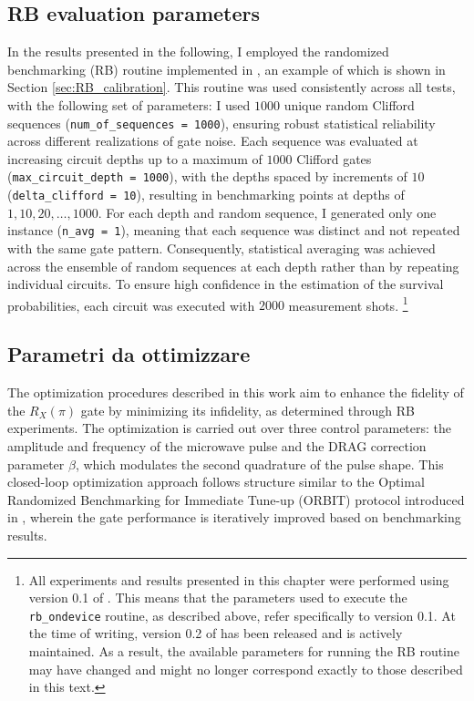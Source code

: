 \subsection{RB evaluation parameters}
In the results presented in the following, I employed the randomized benchmarking (RB) routine implemented in \Qibocal, an example of which is shown in Section \ref{sec:RB_calibration}. 
This routine was used consistently across all tests, with the following set of parameters: I used $1000$ unique random Clifford sequences (\texttt{num\_of\_sequences = 1000}), ensuring robust statistical reliability across different realizations of gate noise. 
Each sequence was evaluated at increasing circuit depths up to a maximum of $1000$ Clifford gates (\texttt{max\_circuit\_depth = 1000}), with the depths spaced by increments of $10$ (\texttt{delta\_clifford = 10}), resulting in benchmarking points at depths of $1, 10, 20, \ldots, 1000$. 
For each depth and random sequence, I generated only one instance (\texttt{n\_avg = 1}), meaning that each sequence was distinct and not repeated with the same gate pattern. 
Consequently, statistical averaging was achieved across the ensemble of random sequences at each depth rather than by repeating individual circuits. 
To ensure high confidence in the estimation of the survival probabilities, each circuit was executed with $2000$ measurement shots. %
\footnote{All experiments and results presented in this chapter were performed using version 0.1 of \Qibocal. This means that the parameters used to execute the \texttt{rb\_ondevice} routine, as described above, refer specifically to version 0.1. At the time of writing, version 0.2 of \Qibocal has been released and is actively maintained. As a result, the available parameters for running the RB routine may have changed and might no longer correspond exactly to those described in this text.}

\subsection{Parametri da ottimizzare}

The optimization procedures described in this work aim to enhance the fidelity of the $R_X(\pi)$ gate by minimizing its infidelity, as determined through RB experiments. 
The optimization is carried out over three control parameters: the amplitude and frequency of the microwave pulse and the DRAG correction parameter $\beta$, which modulates the second quadrature of the pulse shape. 
This closed-loop optimization approach follows structure similar to the Optimal Randomized Benchmarking for Immediate Tune-up (ORBIT) protocol introduced in \cite{kelly_optimal_2014}, wherein the gate performance is iteratively improved based on benchmarking results.

